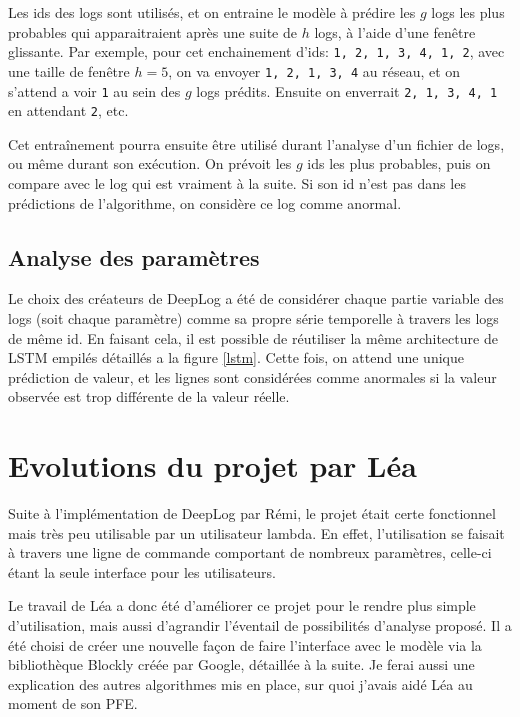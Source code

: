 \documentclass[openany, 12pt]{memoir}
\begin{document}
Les ids des \glspl{log} sont utilisés, et on entraine le modèle à prédire les $g$ \glspl{log} les plus probables qui apparaitraient après une suite de $h$ \glspl{log}, à l'aide d'une fenêtre glissante. Par exemple, pour cet enchainement d'ids: \texttt{1, 2, 1, 3, 4, 1, 2}, avec une taille de fenêtre $h=5$, on va envoyer \texttt{1, 2, 1, 3, 4} au réseau, et on s'attend a voir \texttt{1} au sein des $g$ \glspl{log} prédits. Ensuite on enverrait \texttt{2, 1, 3, 4, 1} en attendant \texttt{2}, etc.

\bigskip
Cet entraînement pourra ensuite être utilisé durant l'analyse d'un fichier de \glspl{log}, ou même durant son exécution. On prévoit les $g$ ids les plus probables, puis on compare avec le \gls{log} qui est vraiment à la suite. Si son id n'est pas dans les prédictions de l'algorithme, on considère ce log comme anormal.

\subsection{Analyse des paramètres}

Le choix des créateurs de DeepLog a été de considérer chaque partie variable des \glspl{log} (soit chaque paramètre) comme sa propre série temporelle à travers les \glspl{log} de même id. En faisant cela, il est possible de réutiliser la même architecture de \gls{LSTM} empilés détaillés a la figure \ref{lstm}. Cette fois, on attend une unique prédiction de valeur, et les lignes sont considérées comme anormales si la valeur observée est trop différente de la valeur réelle.

\section{Evolutions du projet par Léa}

Suite à l'implémentation de DeepLog par Rémi, le projet était certe fonctionnel mais très peu utilisable par un utilisateur lambda. En effet, l'utilisation se faisait à travers une ligne de commande comportant de nombreux paramètres, celle-ci étant la seule interface pour les utilisateurs.

Le travail de Léa a donc été d'améliorer ce projet pour le rendre plus simple d'utilisation, mais aussi d'agrandir l'éventail de possibilités d'analyse proposé. Il a été choisi de créer une nouvelle façon de faire l'interface avec le modèle via la bibliothèque Blockly créée par Google, détaillée à la suite. Je ferai aussi une explication des autres algorithmes mis en place, sur quoi j'avais aidé Léa au moment de son PFE.
\end{document}
